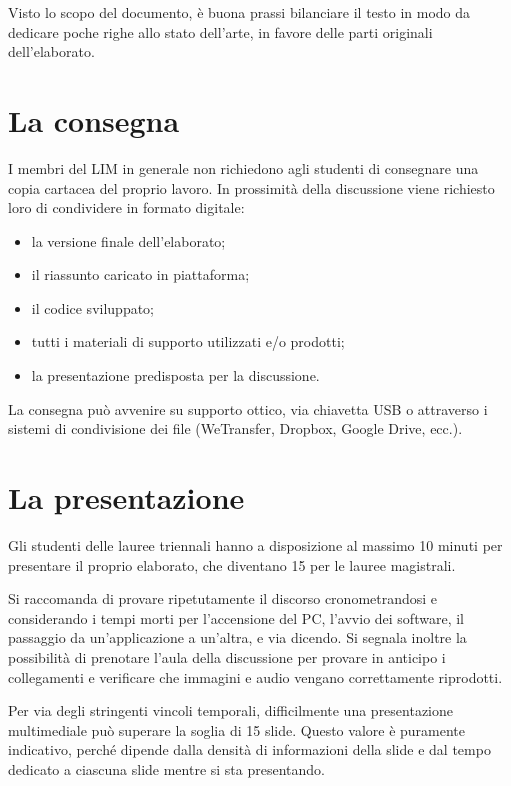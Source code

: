 \documentclass[12pt]{report}
\begin{document}
Visto lo scopo del documento, è buona prassi bilanciare il testo in modo da dedicare poche righe allo stato dell'arte, in favore delle parti originali dell'elaborato.


\chapter{La consegna}

I membri del LIM in generale non richiedono agli studenti di consegnare una copia cartacea del proprio lavoro. In prossimità della discussione viene richiesto loro di condividere in formato digitale:

\begin{itemize}
	\item la versione finale dell'elaborato;
	\item il riassunto caricato in piattaforma;
	\item il codice sviluppato;
	\item tutti i materiali di supporto utilizzati e/o prodotti;
	\item la presentazione predisposta per la discussione.
\end{itemize}

La consegna può avvenire su supporto ottico, via chiavetta USB o attraverso i sistemi di condivisione dei file (WeTransfer, Dropbox, Google Drive, ecc.).



\chapter{La presentazione}

Gli studenti delle lauree triennali hanno a disposizione al massimo 10 minuti per presentare il proprio elaborato, che diventano 15 per le lauree magistrali. 

Si raccomanda di provare ripetutamente il discorso cronometrandosi e considerando i tempi morti per l'accensione del PC, l'avvio dei software, il passaggio da un'applicazione a un'altra, e via dicendo. Si segnala inoltre la possibilità di prenotare l'aula della discussione per provare in anticipo i collegamenti e verificare che immagini e audio vengano correttamente riprodotti.

Per via degli stringenti vincoli temporali, difficilmente una presentazione multimediale può superare la soglia di 15 slide. Questo valore è puramente indicativo, perché dipende dalla densità di informazioni della slide e dal tempo dedicato a ciascuna slide mentre si sta presentando.
\end{document}
